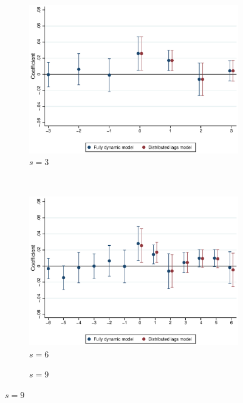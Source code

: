 \clearpage
\begin{figure}[htb!]
	\caption{Dynamic coefficients for different window $s$}
	\label{fig:dynamic_change_window}
	\centering
	\begin{subfigure}[b]{0.5\textwidth}
		\caption{$s=3$}
		\includegraphics[width = .9\textwidth]
		{../../analysis/first_differences/output/fd_models_coeffs_w3.eps}
	\end{subfigure}\\
	\begin{subfigure}[b]{0.5\textwidth}
		\caption{$s=6$}
		\includegraphics[width = .95\textwidth]
		{../../analysis/first_differences/output/fd_models_coeffs_w6.eps}
	\end{subfigure}%
	\begin{subfigure}[b]{0.5\textwidth}
		\caption{$s=9$}

\end{subfigure}
\end{figure}
